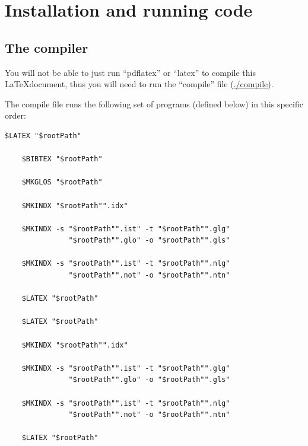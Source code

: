 


\section{Installation and running code}
    \label{ch1_section_installation}



\subsection{The compiler}
    \label{ch1_section_installation_modifying_tex_path}

    You will not be able to just run ``pdflatex'' or ``latex'' to compile this \LaTeX document, thus you will need to run the ``compile'' file (\url{./compile}).

    The compile file runs the following set of programs (defined below) in this specific order:

    \begin{lstlisting}[style=base]
    $LATEX "$rootPath"

    $BIBTEX "$rootPath"

    $MKGLOS "$rootPath"

    $MKINDX "$rootPath"".idx"

    $MKINDX -s "$rootPath"".ist" -t "$rootPath"".glg" 
               "$rootPath"".glo" -o "$rootPath"".gls"

    $MKINDX -s "$rootPath"".ist" -t "$rootPath"".nlg" 
               "$rootPath"".not" -o "$rootPath"".ntn"

    $LATEX "$rootPath"

    $LATEX "$rootPath"

    $MKINDX "$rootPath"".idx"

    $MKINDX -s "$rootPath"".ist" -t "$rootPath"".glg" 
               "$rootPath"".glo" -o "$rootPath"".gls"

    $MKINDX -s "$rootPath"".ist" -t "$rootPath"".nlg" 
               "$rootPath"".not" -o "$rootPath"".ntn"

    $LATEX "$rootPath"
    \end{lstlisting}

